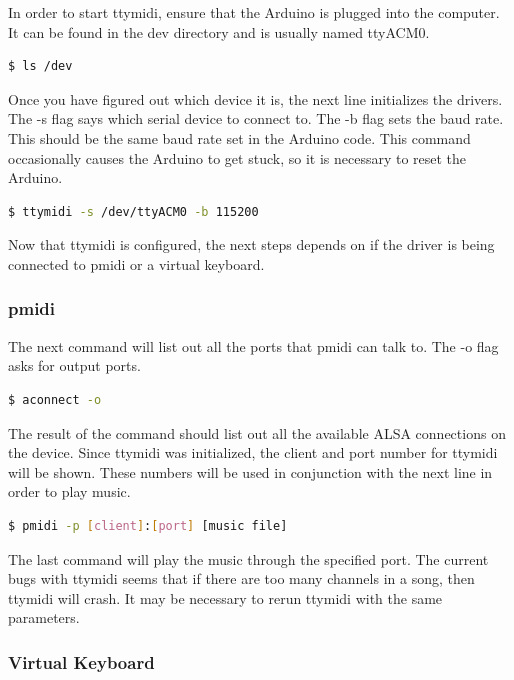 \documentclass[11pt, a4paper]{report}
\begin{document}
In order to start ttymidi, ensure that the Arduino is plugged into the computer. It can be found in the dev directory and is usually named ttyACM0. 

\begin{lstlisting}[language=bash]
  $ ls /dev
\end{lstlisting}

Once you have figured out which device it is, the next line initializes the drivers. The -s flag says which serial device to connect to. The -b flag sets the baud rate. This should be the same baud rate set in the Arduino code. This command occasionally causes the Arduino to get stuck, so it is necessary to reset the Arduino.

\begin{lstlisting}[language=bash]
  $ ttymidi -s /dev/ttyACM0 -b 115200
\end{lstlisting}

Now that ttymidi is configured, the next steps depends on if the driver is being connected to pmidi or a virtual keyboard.

\subsubsection{pmidi}

The next command will list out all the ports that pmidi can talk to. The -o flag asks for output ports. 

\begin{lstlisting}[language=bash]
  $ aconnect -o
\end{lstlisting}

The result of the command should list out all the available ALSA connections on the device. Since ttymidi was initialized, the client and port number for ttymidi will be shown. These numbers will be used in conjunction with the next line in order to play music. 

\begin{lstlisting}[language=bash]
  $ pmidi -p [client]:[port] [music file]
\end{lstlisting}

The last command will play the music through the specified port. The current bugs with ttymidi seems that if there are too many channels in a song, then ttymidi will crash. It may be necessary to rerun ttymidi with the same parameters. 

\subsubsection{Virtual Keyboard}
\end{document}
